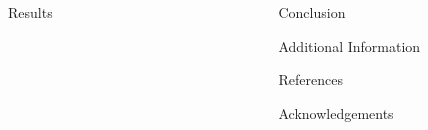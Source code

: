 \documentclass[final]{beamer}
\newlength{\sepwid}
\newlength{\onecolwid}
\newlength{\twocolwid}
\begin{document}
\begin{frame}[t]
\begin{columns}[t]
\begin{column}{\twocolwid}
\begin{columns}[t,totalwidth=\twocolwid]
\begin{column}{\onecolwid}
\begin{block}{Results}


\end{block}


\end{column} %

\end{columns} %

\end{column} %

\begin{column}{\sepwid}\end{column} %

\begin{column}{\onecolwid} %


\begin{block}{Conclusion}

\end{block}

\begin{block}{Additional Information}

\end{block}

\begin{block}{References}

\small{
\vspace{0.75in}}

\end{block}


\begin{block}{Acknowledgements}

\end{block}



\end{column}
\end{columns}
\end{frame}
\end{document}
